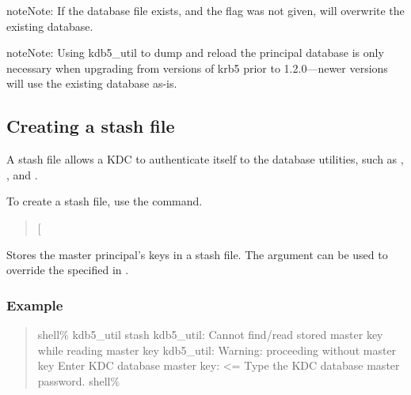 \documentclass[letterpaper,10pt,english]{sphinxmanual}
\begin{document}
\begin{sphinxadmonition}{note}{Note:}
If the database file exists, and the  flag was not
given,  will overwrite the existing database.
\end{sphinxadmonition}

\begin{sphinxadmonition}{note}{Note:}
Using kdb5\_util to dump and reload the principal database is
only necessary when upgrading from versions of krb5 prior
to 1.2.0—newer versions will use the existing database as-is.
\end{sphinxadmonition}


\subsection{Creating a stash file}
\label{\detokenize{admin/database:create-stash}}\label{\detokenize{admin/database:creating-a-stash-file}}
A stash file allows a KDC to authenticate itself to the database
utilities, such as {\hyperref[\detokenize{admin/admin_commands/kadmind:kadmind-8}]{}}, {\hyperref[\detokenize{admin/admin_commands/krb5kdc:krb5kdc-8}]{}}, and
{\hyperref[\detokenize{admin/admin_commands/kdb5_util:kdb5-util-8}]{}}.

To create a stash file, use the {\hyperref[\detokenize{admin/admin_commands/kdb5_util:kdb5-util-8}]{}}  command.
\begin{quote}

 {[} \sphinxstyleemphasis{keyfile}{]}
\end{quote}

Stores the master principal’s keys in a stash file.  The 
argument can be used to override the  specified in
{\hyperref[\detokenize{admin/conf_files/kdc_conf:kdc-conf-5}]{}}.


\subsubsection{Example}
\label{\detokenize{admin/database:example}}\begin{quote}

shell\% kdb5\_util stash
kdb5\_util: Cannot find/read stored master key while reading master key
kdb5\_util: Warning: proceeding without master key
Enter KDC database master key:  \textless{}= Type the KDC database master password.
shell\%
\end{quote}
\end{document}
